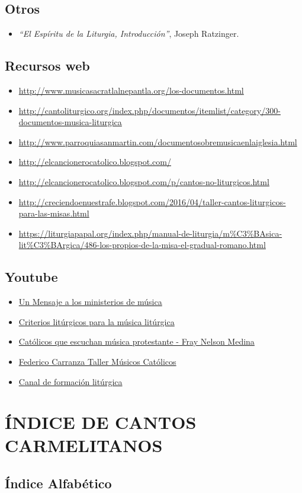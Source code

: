 \documentclass[letterpaper, 12pt]{book}
\begin{document}
    \section{Otros}
    
    \begin{itemize}
        \item \textit{``El Esp\'iritu de la Liturgia, Introducci\'on''}, Joseph Ratzinger.
    \end{itemize}

    \section{Recursos web}
    
    \begin{itemize}
        \item \url{http://www.musicasacratlalnepantla.org/los-documentos.html}
        \item \url{http://cantoliturgico.org/index.php/documentos/itemlist/category/300-documentos-musica-liturgica}
        \item \url{http://www.parroquiasanmartin.com/documentosobremusicaenlaiglesia.html}
        \item \url{http://elcancionerocatolico.blogspot.com/}
        \item \url{http://elcancionerocatolico.blogspot.com/p/cantos-no-liturgicos.html}
        \item \url{http://creciendoenuestrafe.blogspot.com/2016/04/taller-cantos-liturgicos-para-las-misas.html}
        \item \url{https://liturgiapapal.org/index.php/manual-de-liturgia/m%C3%BAsica-lit%C3%BArgica/486-los-propios-de-la-misa-el-gradual-romano.html}
    \end{itemize}
    
    \section{Youtube}
    
    \begin{itemize}
        \item \href{https://www.youtube.com/watch?v=fneWZZxMtCg}{Un Mensaje a los ministerios de m\'usica}
        \item \href{https://www.youtube.com/watch?v=VbwpGPDTFLs&t=4330s}{Criterios lit\'urgicos para la m\'usica lit\'urgica}
        \item \href{https://www.youtube.com/watch?v=ifKsd_WaGYs}{Cat\'olicos que escuchan m\'usica protestante - Fray Nelson Medina}
        \item \href{https://www.youtube.com/watch?v=2uRWvQKjDuE}{Federico Carranza Taller M\'usicos Cat\'olicos}
        \item \href{https://www.youtube.com/channel/UCmz3xMzWaedrM6DHjGjG5kw}{Canal de formaci\'on lit\'urgica}
    \end{itemize}

    \chapter{\'INDICE DE CANTOS CARMELITANOS}
    
    \section{\'Indice Alfab\'etico}
\end{document}
